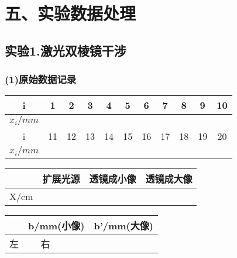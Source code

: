 \documentclass[11pt,a4paper,oneside]{article}
\begin{document}
\section*{五、实验数据处理}
\subsection*{实验1.激光双棱镜干涉}
\subsubsection*{(1)原始数据记录}

\begin{center}
\begin{table}[htbp]
\begin{tabular}{|c|c|c|c|c|c|c|c|c|c|c|}
\hline 
i & 1 & 2 & 3 & 4 & 5 & 6 & 7 & 8 & 9 & 10 
\\ 
\hline 
$x_i/mm$
{%
{%
&%
{%
{%
\\ 
\hline 
i & 11 & 12 & 13 & 14 & 15 & 16 & 17 & 18 & 19 & 20 
\\ 
\hline 
$x_i/mm$ 
{%
{%
&%
{%
{%
\\ 
\hline 
\end{tabular} 
\end{table}
\begin{table}[htbp]
\begin{tabular}{|c|c|c|c|}
\hline 
   & 扩展光源 & 透镜成小像 & 透镜成大像 \\ 
\hline 
X/cm 
{%
&%
{%
\\
\hline 
\end{tabular} 
\end{table}
\begin{table}[htbp]
\begin{tabular}{|c|c|c|c|c|}
\hline  
 & \multicolumn{2}{|c|}{b/mm(小像) }& \multicolumn{2}{|c|}{b'/mm(大像)} \\ 
\hline 
左 & %
\hline 
右 & %
\hline 
\end{tabular}
\end{table}
\end{center}
\end{document}
